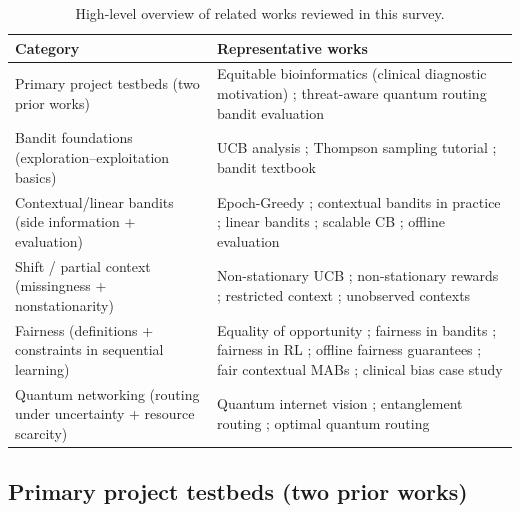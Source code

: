\documentclass[conference]{IEEEtran}
\begin{document}
\begin{table}[t]
\caption{High-level overview of related works reviewed in this survey.}
\centering
\small
\begin{tabular}{p{} p{}}
\toprule
Category & Representative works \\
\midrule
Primary project testbeds (two prior works)
  & Equitable bioinformatics (clinical diagnostic motivation) \cite{garcia2025equitable_bioinformatics};
    threat-aware quantum routing bandit evaluation \cite{garcia2026threat_aware_quantum_routing} \\
Bandit foundations (exploration--exploitation basics)
  & UCB analysis \cite{auer2002finite};
    Thompson sampling tutorial \cite{russo2018tutorial};
    bandit textbook \cite{lattimore2020bandit} \\
Contextual/linear bandits (side information + evaluation)
  & Epoch-Greedy \cite{langford2007epoch};
    contextual bandits in practice \cite{li2010contextual};
    linear bandits \cite{abbasi2011linear};
    scalable CB \cite{agarwal2014taming};
    offline evaluation \cite{dudik2011doubly} \\
Shift / partial context (missingness + nonstationarity)
  & Non-stationary UCB \cite{garivier2008ucb};
    non-stationary rewards \cite{besbes2014stochastic};
    restricted context \cite{bouneffouf2017context};
    unobserved contexts \cite{park2022efficient} \\
Fairness (definitions + constraints in sequential learning)
  & Equality of opportunity \cite{hardt2016equality};
    fairness in bandits \cite{joseph2016fairness};
    fairness in RL \cite{jabbari2017fairness};
    offline fairness guarantees \cite{metevier2019offline};
    fair contextual MABs \cite{chen2020fair};
    clinical bias case study \cite{obermeyer2019dissecting} \\
Quantum networking (routing under uncertainty + resource scarcity)
  & Quantum internet vision \cite{wehner2018quantum};
    entanglement routing \cite{pant2019routing};
    optimal quantum routing \cite{caleffi2017optimal} \\
\bottomrule
\end{tabular}
\label{tab:overview}
\end{table}

\subsection{Primary project testbeds (two prior works)}
\label{sec:related_testbeds}
\end{document}
